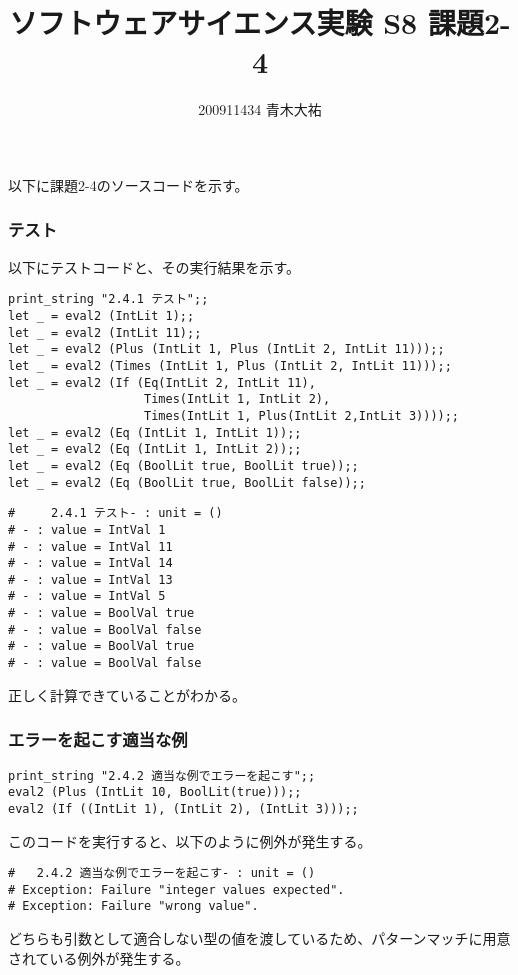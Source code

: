 \documentclass[a4paper,9pt]{jarticle}
\title{ソフトウェアサイエンス実験 S8 課題2-4}
\author{200911434 青木大祐}
\begin{document}
\maketitle
\setcounter{section}{2}
\setcounter{subsection}{4}

\newpage
以下に課題2-4のソースコードを示す。

\newpage

\subsubsection{テスト}

以下にテストコードと、その実行結果を示す。\\
\begin{lstlisting}
print_string "2.4.1 テスト";;
let _ = eval2 (IntLit 1);;
let _ = eval2 (IntLit 11);;
let _ = eval2 (Plus (IntLit 1, Plus (IntLit 2, IntLit 11)));;
let _ = eval2 (Times (IntLit 1, Plus (IntLit 2, IntLit 11)));;
let _ = eval2 (If (Eq(IntLit 2, IntLit 11),
                   Times(IntLit 1, IntLit 2),
                   Times(IntLit 1, Plus(IntLit 2,IntLit 3))));;
let _ = eval2 (Eq (IntLit 1, IntLit 1));;
let _ = eval2 (Eq (IntLit 1, IntLit 2));;
let _ = eval2 (Eq (BoolLit true, BoolLit true));;
let _ = eval2 (Eq (BoolLit true, BoolLit false));;
\end{lstlisting}

\begin{lstlisting}
#     2.4.1 テスト- : unit = ()
# - : value = IntVal 1
# - : value = IntVal 11
# - : value = IntVal 14
# - : value = IntVal 13
# - : value = IntVal 5
# - : value = BoolVal true
# - : value = BoolVal false
# - : value = BoolVal true
# - : value = BoolVal false
\end{lstlisting}
正しく計算できていることがわかる。

\subsubsection{エラーを起こす適当な例}

\begin{lstlisting}
print_string "2.4.2 適当な例でエラーを起こす";;
eval2 (Plus (IntLit 10, BoolLit(true)));;
eval2 (If ((IntLit 1), (IntLit 2), (IntLit 3)));;
\end{lstlisting}
このコードを実行すると、以下のように例外が発生する。

\begin{lstlisting}
#   2.4.2 適当な例でエラーを起こす- : unit = ()
# Exception: Failure "integer values expected".
# Exception: Failure "wrong value".
\end{lstlisting}
どちらも引数として適合しない型の値を渡しているため、パターンマッチに用意
されている例外が発生する。
\end{document}
